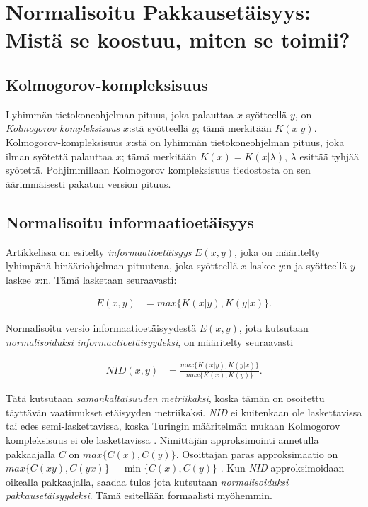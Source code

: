 \documentclass[11pt,finnish]{tktltiki2}
\theoremstyle{definition}
\theoremstyle{remark}
\begin{document}


\section{Normalisoitu Pakkausetäisyys: Mistä se koostuu, miten se toimii?} %
\label{sec:normalisoitu_pakkauset_isyys}
  \subsection{Kolmogorov-kompleksisuus} %
\label{sub:kolmogorov_kompleksisuus}

  Lyhimmän tietokoneohjelman pituus, joka palauttaa $x$ syötteellä $y$, on \emph{Kolmogorov kompleksisuus} $x$:stä syötteellä $y$; tämä merkitään $K(x|y)$. Kolmogorov-kompleksisuus $x$:stä on lyhimmän tietokoneohjelman pituus, joka ilman syötettä palauttaa $x$; tämä merkitään $K(x)=K(x|\lambda)$, $\lambda$ esittää tyhjää syötettä. Pohjimmillaan Kolmogorov kompleksisuus tiedostosta on sen äärimmäisesti pakatun version pituus.

\subsection{Normalisoitu informaatioetäisyys} %
\label{sub:normalisoitu_informaatioet_isyys}

  Artikkelissa \cite{CV05} on esitelty \emph{informaatioetäisyys} $E(x,y)$, joka on määritelty lyhimpänä binääriohjelman pituutena, joka syötteellä $x$ laskee $y$:n ja syötteellä $y$ laskee $x$:n. Tämä lasketaan seuraavasti:

  \begin{align}
    E(x,y) &= max\{K(x|y),K(y|x)\}.
  \end{align}

  Normalisoitu versio informaatioetäisyydestä $E(x,y)$, jota kutsutaan \emph{normalisoiduksi informaatioetäisyydeksi}, on määritelty seuraavasti

  \begin{align}
    NID(x,y) &= \frac{ max\{K{(x|y)},K{(y|x)}\} }{ max \{K(x),K(y)\}}.
  \end{align}

  Tätä kutsutaan \emph{samankaltaisuuden metriikaksi}, koska tämän on osoitettu \cite{CV05} täyttävän vaatimukset etäisyyden metriikaksi. \emph{NID} ei kuitenkaan ole laskettavissa tai edes semi-laskettavissa, koska Turingin määritelmän mukaan Kolmogorov kompleksisuus ei ole laskettavissa \cite{CV05}.
  Nimittäjän approksimointi annetulla pakkaajalla $C$ on $max \{C(x),C(y)\}$. Osoittajan paras approksimaatio on $max\{C(xy),C(yx)\} - \min\{C(x),C(y)\}$ \cite{CV05}.
  Kun \emph{NID} approksimoidaan oikealla pakkaajalla, saadaa tulos jota kutsutaan \emph{normalisoiduksi pakkausetäisyydeksi}. Tämä esitellään formaalisti myöhemmin.
\end{document}
